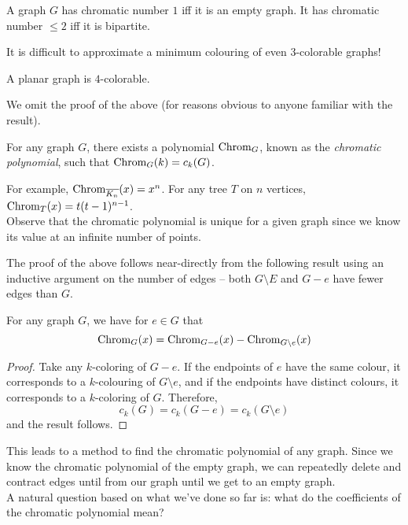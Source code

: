 	\begin{prop}
		A graph $G$ has chromatic number $1$ iff it is an empty graph. It has chromatic number $\le 2$ iff it is bipartite.
	\end{prop}

	It is difficult to approximate a minimum colouring of even $3$-colorable graphs!

	\begin{ftheo}
		A planar graph is $4$-colorable.
	\end{ftheo}
	We omit the proof of the above (for reasons obvious to anyone familiar with the result).

	\begin{ftheo}
		For any graph $G$, there exists a polynomial $\operatorname{Chrom}_G$, known as the \emph{chromatic polynomial}, such that $\operatorname{Chrom}_G(k) = c_k(G)$.
	\end{ftheo}
	For example, $\operatorname{Chrom}_{\overline{K_n}}(x) = x^n$. For any tree $T$ on $n$ vertices, $\operatorname{Chrom}_T(x) = t(t-1)^{n-1}$.\\
	Observe that the chromatic polynomial is unique for a given graph since we know its value at an infinite number of points.
	
	The proof of the above follows near-directly from the following result using an inductive argument on the number of edges -- both $G\setminus E$ and $G-e$ have fewer edges than $G$.

	\begin{fprop}
		\label{prop: deletion contraction recurrence}
		For any graph $G$, we have for $e \in G$ that
		\[ \operatorname{Chrom}_G(x) = \operatorname{Chrom}_{G-e}(x) - \operatorname{Chrom}_{G\setminus e}(x) \]
	\end{fprop}
	\begin{proof}
		Take any $k$-coloring of $G-e$. If the endpoints of $e$ have the same colour, it corresponds to a $k$-colouring of $G\setminus e$, and if the endpoints have distinct colours, it corresponds to a $k$-coloring of $G$. Therefore,
		\[ c_k(G) = c_k(G-e) = c_k(G\setminus e) \]
		and the result follows.
	\end{proof}
	This leads to a method to find the chromatic polynomial of any graph. Since we know the chromatic polynomial of the empty graph, we can repeatedly delete and contract edges until from our graph until we get to an empty graph.\\
	A natural question based on what we've done so far is: what do the coefficients of the chromatic polynomial mean?

